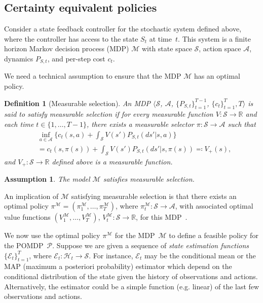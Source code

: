 \documentclass[letterpaper, 10pt]{IEEEtran}
\theoremstyle{plain}
\newtheorem{definition}{Definition}
\theoremstyle{nonumberplain}
\theoremstyle{plain}
\newtheorem{assumption}{Assumption}
\newcommand*\ALPHABET{\mathcal}
\newcommand*\reals{\mathds{R}}
\newcommand\EST{\mathcal{E}}
\begin{document}
\subsection{Certainty equivalent policies}\label{sec:gce}
Consider a state feedback controller for the stochastic system defined above, where the controller has access to the state $S_t$ at time~$t$. This system is a finite horizon Markov decision process (MDP) $\ALPHABET M$ with state space $\ALPHABET S$, action space $\ALPHABET A$, dynamics $P_{S,t}$, and per-step cost $c_t$. 

We need a technical assumption to ensure that the MDP $\ALPHABET M$ has an optimal policy. 
\begin{definition}[Measurable selection]
    An MDP $\langle \ALPHABET S$, $\ALPHABET A$, $\{P_{S,t}\}_{t=1}^{T-1}$, $\{c_t\}_{t=1}^T, T\rangle$
    is said to satisfy \emph{measurable selection} if for every measurable function $V\colon \ALPHABET S \to \reals$ and each time $t \in \{1, \dots, T-1\}$, there exists a measurable selector $\pi\colon \ALPHABET S \to \ALPHABET A$ such that 
        \begin{align*}
        & \inf_{a \in \ALPHABET A} \biggl\{
        c_t(s, a) + \int_{\ALPHABET S} V(s') P_{S,t}(ds' | s,a) 
        \biggr\}
        \\
        & = 
        c_t(s, \pi(s)) + \int_{\ALPHABET S} V(s') P_{S,t}(ds' | s,\pi(s))
        \eqqcolon V_{+}(s),
                \end{align*}
        and $V_{+}\colon \ALPHABET S \to \reals$ defined above is a measurable function.
\end{definition}

\begin{assumption}\label{ass:meas-selection}
    The model ${\ALPHABET M}$ satisfies measurable selection.
\end{assumption}

An implication of ${\ALPHABET M}$ satisfying measurable selection is that there exists an optimal policy $\pi^{{\ALPHABET M}} = (\pi^{{\ALPHABET M}}_1, \dots, \pi^{{\ALPHABET M}}_T)$, where $\pi^{ {\ALPHABET M}}_t \colon  {\ALPHABET S}  \to \ALPHABET A$, with associated optimal value functions $(V^{ {\ALPHABET M}}_1, \dots, V^{ {\ALPHABET M}}_T)$, $V^{ {\ALPHABET M}}_t \colon  {\ALPHABET S} \to \reals$, for this MDP~\cite{hernandez2012discrete}. 

We now use the optimal policy $\pi^{ {\ALPHABET M}}$ for the MDP~${\ALPHABET M}$ to define a feasible policy for the POMDP~$\ALPHABET P$. 
Suppose we are given a sequence of \emph{ state estimation functions} $\{\EST_t\}_{t=1}^T$, where $\EST_t \colon \ALPHABET H_t \to  {\ALPHABET S}$. 
For instance, $\EST_t$ may be the conditional mean or the MAP (maximum a posteriori probability) estimator which depend on the conditional distribution of the state given the history of observations and actions. Alternatively, the estimator could be a simple function (e.g. linear) of the last few  observations and actions. 
\end{document}
